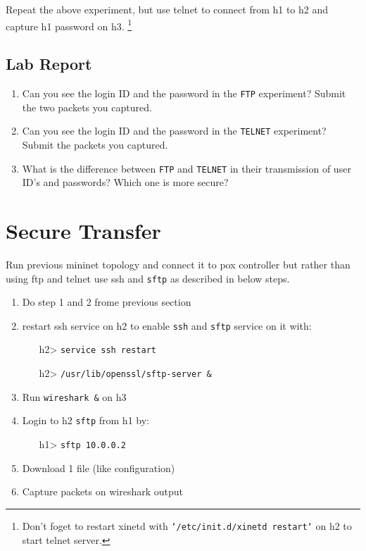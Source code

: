 \documentclass[10pt,a4paper]{article}
\numberwithin{equation}{section}
\numberwithin{figure}{section}
\numberwithin{table}{section}
\begin{document}
	Repeat the above experiment, but use telnet to connect from h1 to h2 and capture h1 password on h3. \footnote{Don't foget to restart xinetd with \texttt{`/etc/init.d/xinetd restart`} on h2 to start telnet server. }
	
	\subsection*{Lab Report}
	\begin{enumerate}
		\setlength{\itemindent}{0pt}
		\item Can you see the login ID and the password in the \texttt{FTP} experiment? Submit the two packets you captured.
		\item Can you see the login ID and the password in the \texttt{TELNET} experiment? Submit the packets you captured.
		\item What is the difference between \texttt{FTP} and \texttt{TELNET} in their transmission of user ID’s and passwords? Which one is more secure?
	\end{enumerate}
	
	\section{Secure Transfer}
	Run previous mininet topology and connect it to pox controller but rather than using ftp and telnet use ssh and \texttt{sftp} as described in below steps.
	
	\begin{enumerate}
		\setlength{\itemindent}{10pt}
		\item Do step 1 and 2 frome previous section
		\item restart ssh service on h2 to enable \texttt{ssh} and \texttt{sftp} service on it with:
		\begin{enumerate}
			\setlength{\itemindent}{10pt}
			\item [h2>] \texttt{service ssh restart}
			\item [h2>] \texttt{/usr/lib/openssl/sftp-server \&}
		\end{enumerate}
		\item Run \texttt{wireshark \&} on h3
		\item Login to h2 \texttt{sftp} from h1 by:
		\begin{enumerate}
			\setlength{\itemindent}{10pt}
			\item [h1>] \texttt{sftp 10.0.0.2}
		\end{enumerate}
		\item Download 1 file (like configuration)
		\item Capture packets on wireshark output
		
	\end{enumerate}
	
\end{document}
